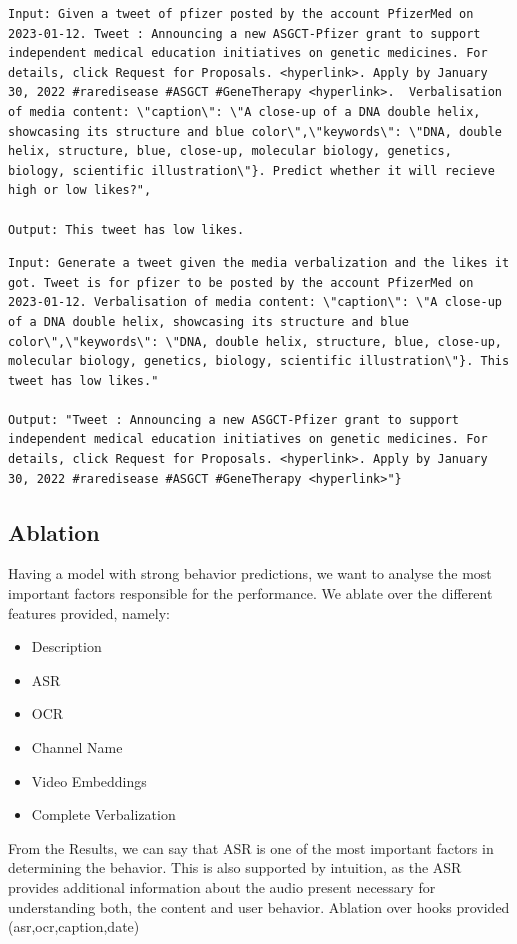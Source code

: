 \begin{lstlisting}[caption={Verbalization pattern of Twitter posts for the behavior simulation task:},frame=single,label={listing-twitter-behavior-simulation},basicstyle=\scriptsize]
Input: Given a tweet of pfizer posted by the account PfizerMed on 2023-01-12. Tweet : Announcing a new ASGCT-Pfizer grant to support independent medical education initiatives on genetic medicines. For details, click Request for Proposals. <hyperlink>. Apply by January 30, 2022 #raredisease #ASGCT #GeneTherapy <hyperlink>.  Verbalisation of media content: \"caption\": \"A close-up of a DNA double helix, showcasing its structure and blue color\",\"keywords\": \"DNA, double helix, structure, blue, close-up, molecular biology, genetics, biology, scientific illustration\"}. Predict whether it will recieve high or low likes?", 

Output: This tweet has low likes.
\end{lstlisting}


\begin{lstlisting}[caption={Verbalization pattern of Twitter posts for the content simulation task:},frame=single,label={listing-twitter-content-simulation},basicstyle=\scriptsize]
Input: Generate a tweet given the media verbalization and the likes it got. Tweet is for pfizer to be posted by the account PfizerMed on 2023-01-12. Verbalisation of media content: \"caption\": \"A close-up of a DNA double helix, showcasing its structure and blue color\",\"keywords\": \"DNA, double helix, structure, blue, close-up, molecular biology, genetics, biology, scientific illustration\"}. This tweet has low likes." 

Output: "Tweet : Announcing a new ASGCT-Pfizer grant to support independent medical education initiatives on genetic medicines. For details, click Request for Proposals. <hyperlink>. Apply by January 30, 2022 #raredisease #ASGCT #GeneTherapy <hyperlink>"}
\end{lstlisting}



\iffalse

\subsection{Ablation}
Having a model with strong behavior predictions, we want to analyse the most important factors responsible for the performance.
We ablate over the different features provided, namely:
\begin{itemize}
    \item Description
    \item ASR
    \item OCR
    \item Channel Name
    \item Video Embeddings
    \item Complete Verbalization
\end{itemize}
From the Results, we can say that ASR is one of the most important factors in determining the behavior. This is also supported by intuition, as the ASR provides additional information about the audio present necessary for understanding both, the content and user behavior.
Ablation over hooks provided (asr,ocr,caption,date)


